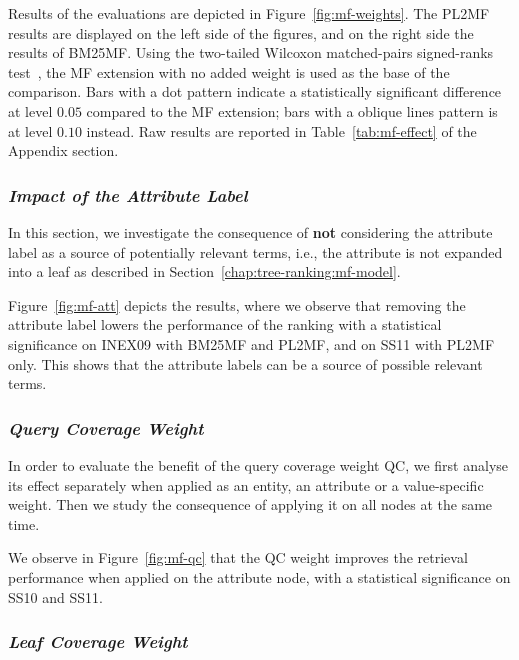 Results of the evaluations are depicted in Figure~\ref{fig:mf-weights}. The PL2MF results are displayed on the left side of the figures, and on the right side the results of BM25MF. Using the two-tailed Wilcoxon matched-pairs signed-ranks test~\cite{sheskin:2003:CRC,buttcher:2010:IRI:1869919}, the MF extension with no added weight is used as the base of the comparison. Bars with a dot pattern indicate a statistically significant difference at level $0.05$ compared to the MF extension; bars with a oblique lines pattern is at level $0.10$ instead. Raw results are reported in Table~\ref{tab:mf-effect} of the Appendix section.

\subsubsection{\emph{Impact of the Attribute Label}}
\label{sec:with-att}

In this section, we investigate the consequence of \textbf{not} considering the attribute label as a source of potentially relevant terms, i.e., the attribute is not expanded into a leaf as described in Section~\ref{chap:tree-ranking:mf-model}.

Figure~\ref{fig:mf-att} depicts the results, where we observe that removing the attribute label lowers the performance of the ranking with a statistical significance on INEX09 with BM25MF and PL2MF, and on SS11 with PL2MF only. This shows that the attribute labels can be a source of possible relevant terms.

\subsubsection{\emph{Query Coverage Weight}}
\label{sec:qc-weight-effect}

In order to evaluate the benefit of the query coverage weight QC, we first analyse its effect separately when applied as an entity, an attribute or a value-specific weight. Then we study the consequence of applying it on all nodes at the same time.

We observe in Figure~\ref{fig:mf-qc} that the QC weight improves the retrieval performance when applied on the attribute node, with a statistical significance on SS10 and SS11.

\subsubsection{\emph{Leaf Coverage Weight}}
\label{sec:lc-weight-effect}


